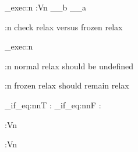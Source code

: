 \documentclass[12pt]{article}
\begin{document}
\precattl_exec:n {
	\assertequal:Vn \__b {\__a }
}

\testname:n {check relax versus frozen relax}

\precattl_exec:n {
	\begingroup
	\let\relax\undefined

	\ifx \relax \undefined
	\else
		\testfail:n {normal relax should be undefined}
	\fi

	\ifx \cFrozenRelax \undefined
		\testfail:n {frozen relax should remain relax}
	\fi
	\endgroup

	\tl_if_eq:nnT {\cFrozenRelax} {\relax} {\testfail:}
	\str_if_eq:nnF {\cFrozenRelax} {\relax} {\testfail:}
}

\begin{precattlenv}
\def\a{123}
\end{precattlenv}
\assertequal:Vn 


\ExplSyntaxOff

\begin{precattlenv}
\def\a{456}
\end{precattlenv}
\ExplSyntaxOn
\assertequal:Vn 
\ExplSyntaxOff
\end{document}
